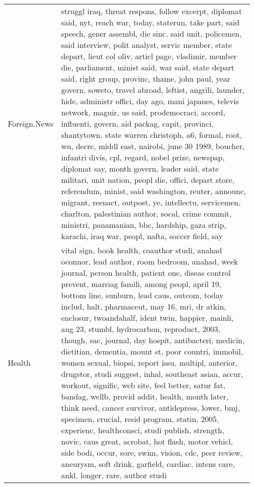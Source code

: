 \begin{longtable}{p{}p{}}
  Foreign.News & struggl iraq, threat respons, follow excerpt, diplomat said, nyt, reach war, today, staterun, take part, said speech, gener assembl, die sinc, said unit, policemen, said interview, polit analyst, servic member, state depart, lieut col oliv, articl page, vladimir, member die, parliament, minist said, war said, state depart said, right group, provinc, thame, john paul, year govern, soweto, travel abroad, leftist, angrili, launder, hide, administr offici, day ago, mani japanes, televis network, maguir, us said, prodemocraci, accord, influenti, govern, aid packag, capit, provinci, shantytown, state warren christoph, a6, formal, root, wu, decre, middl east, nairobi, june 30 1989, boucher, infantri divis, cpl, regard, nobel prize, newspap, diplomat say, month govern, leader said, state militari, unit nation, peopl die, offici, depart store, referendum, minist, said washington, reuter, announc, migrant, reenact, outpost, ye, intellectu, servicemen, charlton, palestinian author, socal, crime commit, ministri, panamanian, bbc, hardship, gaza strip, karachi, iraq war, peopl, nafta, soccer field, say \\ 
  Health & vital sign, book health, coauthor studi, anahad oconnor, lead author, room bedroom, anahad, week journal, person health, patient one, diseas control prevent, marriag famili, among peopl, april 19, bottom line, sunburn, lead caus, outcom, today includ, halt, pharmaceut, may 16, mri, dr atkin, enclosur, twoandahalf, ident twin, happier, mainli, aug 23, stumbl, hydrocarbon, reproduct, 2003, though, sac, journal, day hospit, antibacteri, medicin, dietitian, dementia, mount st, poor countri, immobil, women sexual, biopsi, report issu, multipl, anterior, drugstor, studi suggest, inhal, southeast asian, accur, workout, signific, web site, feel better, satur fat, bandag, wellb, provid addit, health, month later, think need, cancer survivor, antidepress, lower, bmj, specimen, crucial, resid program, statin, 2005, experienc, healthconsci, studi publish, strength, novic, caus great, acrobat, hot flash, motor vehicl, side bodi, occur, sore, swim, vision, cdc, peer review, aneurysm, soft drink, garfield, cardiac, intens care, ankl, longer, rare, author studi \\ 

\end{longtable}
